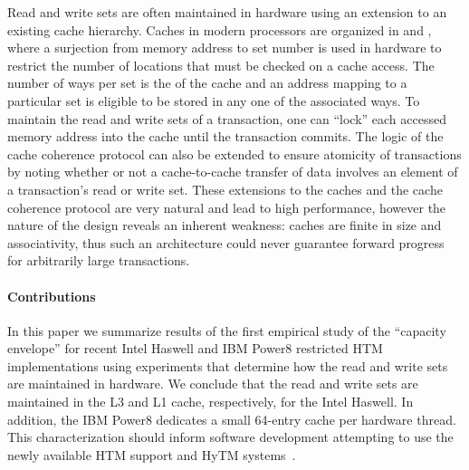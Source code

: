Read and write sets are often maintained in hardware 
using an extension to an existing cache hierarchy.
Caches in modern processors are organized in 
and , where a surjection from memory address to
set number is used in hardware to restrict the number of
locations that must be checked on a cache access.  The
number of ways per set is the  of the cache
and an address mapping to a particular set is eligible
to be stored in any one of the associated ways.  To
maintain the read and write sets of a transaction, one can
``lock'' each accessed memory address 
into the cache until the transaction
commits.  The logic of the cache coherence protocol
can also be extended to ensure atomicity of transactions
by noting whether or not a cache-to-cache transfer of 
data involves an element of a transaction's read or write
set.  These extensions to the caches and the cache coherence
protocol are very natural and lead to high performance, 
however the nature of the design reveals an inherent weakness:
caches are finite in size and associativity, thus such an
architecture could never guarantee forward progress for 
arbitrarily large transactions.

\paragraph{Contributions}
In this paper we summarize results of the first
empirical study of the ``capacity envelope'' for
recent Intel Haswell and IBM Power8 restricted HTM
implementations using experiments that determine how the
read and write sets are maintained in hardware. 
We conclude that the read and write sets are maintained
in the L3 and L1 cache, respectively, for the Intel Haswell.  
In addition, the IBM Power8 dedicates a small 64-entry 
cache per hardware thread.
This characterization should inform
software development attempting to use the newly available HTM support 
and HyTM systems~\cite{DamronFeLe06,MatveevSh13,MatveevSh15}.


